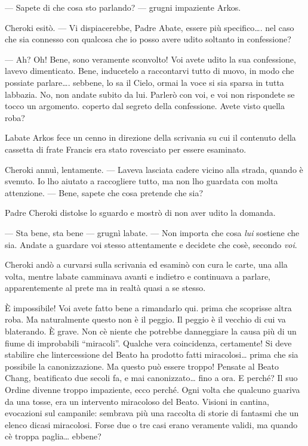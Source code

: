 --- Sapete di che cosa sto parlando? --- grugni impaziente Arkos.

Cheroki esitò. --- Vi dispiacerebbe, Padre Abate, essere più
specifico\ldots. nel caso che sia connesso con qualcosa che io posso
avere udito soltanto in confessione?

--- Ah? Oh! Bene, sono veramente sconvolto! Voi avete udito la sua
confessione, l\textquotesingle avevo dimenticato. Bene, inducetelo a
raccontarvi tutto di nuovo, in modo che possiate parlare\ldots. sebbene,
lo sa il Cielo, ormai la voce si sia sparsa in tutta
l\textquotesingle abbazia. No, non andate subito da lui. Parlerò con
voi, e voi non rispondete se tocco un argomento. coperto dal segreto
della confessione. Avete visto quella roba?

L\textquotesingle abate Arkos fece un cenno in direzione della scrivania
su cui il contenuto della cassetta di frate Francis era stato rovesciato
per essere esaminato.

Cheroki annuì, lentamente. --- L\textquotesingle aveva lasciata cadere
vicino alla strada, quando è svenuto. Io l\textquotesingle ho aiutato a
raccogliere tutto, ma non l\textquotesingle ho guardata con molta
attenzione. --- Bene, sapete che cosa pretende che sia?

Padre Cheroki distolse lo sguardo e mostrò di non aver udito la domanda.

--- Sta bene, sta bene --- grugnì l\textquotesingle abate. --- Non
importa che cosa \emph{lui} sostiene che sia. Andate a guardare voi
stesso attentamente e decidete che cos\textquotesingle è, secondo
\emph{voi}.

Cheroki andò a curvarsi sulla scrivania ed esaminò con cura le carte,
una alla volta, mentre l\textquotesingle abate camminava avanti e
indietro e continuava a parlare, apparentemente al prete ma in realtà
quasi a se stesso.

È impossibile! Voi avete fatto bene a rimandarlo qui. prima che
scoprisse altra roba. Ma naturalmente questo non è il peggio. Il peggio
è il vecchio di cui va blaterando. È grave. Non c\textquotesingle è
niente che potrebbe danneggiare la causa più di un fiume di improbabili
``miracoli''. Qualche vera coincidenza, certamente! Si deve stabilire
che l\textquotesingle intercessione del Beato ha prodotto fatti
miracolosi\ldots{} prima che sia possibile la canonizzazione. Ma questo
può essere troppo! Pensate al Beato Chang, beatificato due secoli fa, e
mai canonizzato\ldots{} fino a ora. E perché? Il suo Ordine divenne
troppo impaziente, ecco perché. Ogni volta che qualcuno guariva da una
tosse, era un intervento miracoloso del Beato. Visioni in cantina,
evocazioni sul campanile: sembrava più una raccolta di storie di
fantasmi che un elenco dicasi miracolosi. Forse due o tre casi erano
veramente validi, ma quando c\textquotesingle è troppa paglia\ldots{}
ebbene?

